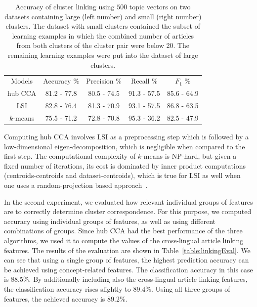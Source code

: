 \begin{table}[t]
\caption[Accuracy of cluster linking: large vs small clusters]{Accuracy of cluster linking using $500$ topic vectors on two datasets containing large (left number)
and small (right number) clusters. The dataset with small clusters contained the subset of
learning examples in which the combined number of articles from both clusters of the cluster
pair were below 20. The remaining learning examples were put into the dataset of large clusters.}
\begin{center}
\begin{tabular}{|c|c|c|c|c|}
  \hline
  \cline{1-5}
  Models & Accuracy \% & Precision \% & Recall \% & $F_1$ \% \\ \cline{1-5}
  hub CCA  & 81.2 - 77.8 & 80.5 - 74.5 & 91.3 - 57.5 & 85.6 - 64.9 \\ \cline{1-5}
  LSI      & 82.8 - 76.4 & 81.3 - 70.9 & 93.1 - 57.5 & 86.8 - 63.5 \\ \cline{1-5}
 $k$-means & 75.5 - 71.2 & 72.8 - 70.8 & 95.3 - 36.2 & 82.5 - 47.9 \\ \cline{1-5}
\end{tabular}
\end{center}
\label{table:linkingEvalAlgosLargeSmall}
\end{table}

\begin{remark}
Computing hub CCA involves LSI as a preprocessing step which is followed by a low-dimensional
eigen-decomposition, which is negligible when compared to the first step. The computational
complexity of $k$-means is NP-hard, but given a fixed number of iterations, its cost is dominated
by inner product computations (centroids-centroids and dataset-centroids), which is true
for LSI as well when one uses a random-projection based approach~\cite{tropp}. 
\end{remark}

In the second experiment, we evaluated how relevant individual groups of features are
to correctly determine cluster correspondence. For this purpose, we computed accuracy using
individual groups of features, as well as using different combinations of groups.
Since hub CCA had the best performance of the three algorithms, we used it to compute
the values of the cross-lingual article linking features. The results of the evaluation
are shown in Table~\ref{table:linkingEval}. We can see that using a single group of features,
the highest prediction accuracy can be achieved using concept-related features.
The classification accuracy in this case is 88.5\%. By additionally including also the
cross-lingual article linking features, the classification accuracy rises slightly
to 89.4\%. Using all three groups of features, the achieved accuracy is 89.2\%.

